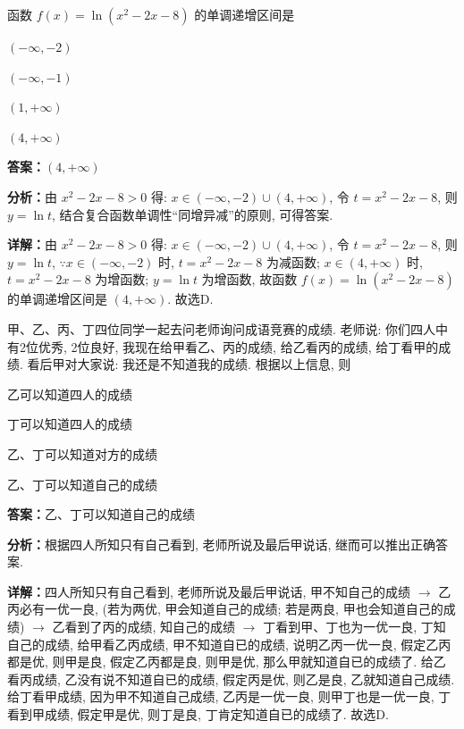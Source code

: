 \begin{question}[points=5]
函数 $f(x)=\ln(x^2-2x-8)$ 的单调递增区间是
\begin{choices}
  \item $(-\infty,-2)$
  \item $(-\infty,-1)$
  \item $(1,+\infty)$
  \item $(4,+\infty)$
\end{choices}
\begin{solution}
\textbf{答案：}$(4,+\infty)$

\textbf{分析：}由 $x^2-2x-8>0$ 得: $x\in(-\infty,-2)\cup(4,+\infty)$, 令 $t=x^2-2x-8$, 则 $y=\ln t$, 结合复合函数单调性“同增异减”的原则, 可得答案.

\textbf{详解：}由 $x^2-2x-8>0$ 得: $x\in(-\infty,-2)\cup(4,+\infty)$, 令 $t=x^2-2x-8$, 则 $y=\ln t$, $\because x\in(-\infty,-2)$ 时, $t=x^2-2x-8$ 为减函数; $x\in(4,+\infty)$ 时, $t=x^2-2x-8$ 为增函数; $y=\ln t$ 为增函数, 故函数 $f(x)=\ln(x^2-2x-8)$ 的单调递增区间是 $(4,+\infty)$. 故选D.
\end{solution}
\end{question}

\begin{question}[points=5]
甲、乙、丙、丁四位同学一起去问老师询问成语竞赛的成绩. 老师说: 你们四人中有2位优秀, 2位良好, 我现在给甲看乙、丙的成绩, 给乙看丙的成绩, 给丁看甲的成绩. 看后甲对大家说: 我还是不知道我的成绩. 根据以上信息, 则
\begin{choices}
  \item 乙可以知道四人的成绩
  \item 丁可以知道四人的成绩
  \item 乙、丁可以知道对方的成绩
  \item 乙、丁可以知道自己的成绩
\end{choices}
\begin{solution}
\textbf{答案：}乙、丁可以知道自己的成绩

\textbf{分析：}根据四人所知只有自己看到, 老师所说及最后甲说话, 继而可以推出正确答案.

\textbf{详解：}四人所知只有自己看到, 老师所说及最后甲说话, 甲不知自己的成绩 $\rightarrow$ 乙丙必有一优一良, (若为两优, 甲会知道自己的成绩; 若是两良, 甲也会知道自己的成绩) $\rightarrow$ 乙看到了丙的成绩, 知自己的成绩 $\rightarrow$ 丁看到甲、丁也为一优一良, 丁知自己的成绩, 给甲看乙丙成绩, 甲不知道自已的成绩, 说明乙丙一优一良, 假定乙丙都是优, 则甲是良, 假定乙丙都是良, 则甲是优, 那么甲就知道自已的成绩了. 给乙看丙成绩, 乙没有说不知道自已的成绩, 假定丙是优, 则乙是良, 乙就知道自己成绩. 给丁看甲成绩, 因为甲不知道自己成绩, 乙丙是一优一良, 则甲丁也是一优一良, 丁看到甲成绩, 假定甲是优, 则丁是良, 丁肯定知道自已的成绩了. 故选D.
\end{solution}
\end{question}

